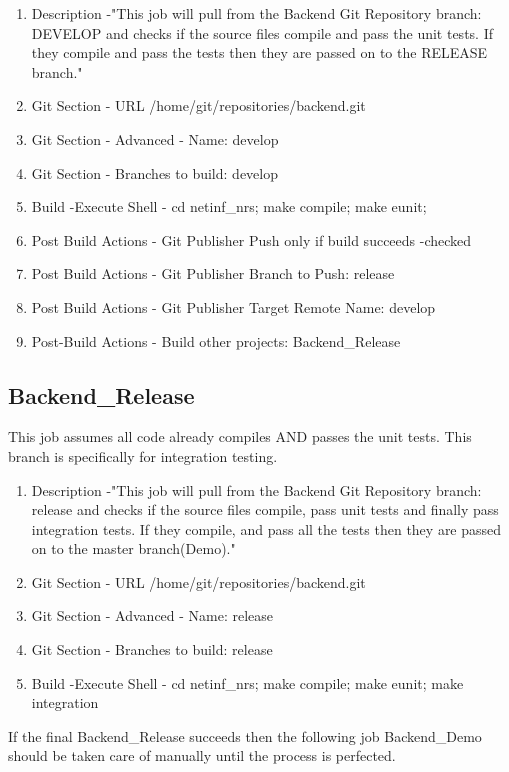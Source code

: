 \begin{enumerate}
\item Description -"This job will pull from the Backend Git Repository branch: DEVELOP and checks if the source files compile and pass the unit tests. If they compile and pass the tests then they are passed on to the RELEASE branch."
\item Git Section - URL /home/git/repositories/backend.git
\item Git Section - Advanced - Name: develop
\item Git Section - Branches to build: develop
\item Build -Execute Shell - cd netinf\_nrs; make compile; make eunit;
\item Post Build Actions - Git Publisher Push only if build succeeds -checked
\item Post Build Actions - Git Publisher Branch to Push: release
\item Post Build Actions - Git Publisher Target Remote Name: develop
\item Post-Build Actions - Build other projects:  Backend\_Release
\end{enumerate}

\subsection{Backend\_Release}

This job assumes all code already compiles AND passes the unit tests. This branch is specifically for integration testing.

\begin{enumerate}
\item Description -"This job will pull from the Backend Git Repository branch: release and checks if the source files compile, pass unit tests and finally pass integration tests. If they compile, and pass all the tests then they are passed on to the master branch(Demo)."
\item Git Section - URL /home/git/repositories/backend.git
\item Git Section - Advanced - Name: release
\item Git Section - Branches to build: release
\item Build -Execute Shell - cd netinf\_nrs; make compile; make eunit; make integration
\end{enumerate}

If the final Backend\_Release succeeds then the following job Backend\_Demo should be taken care of manually until the process is perfected.

